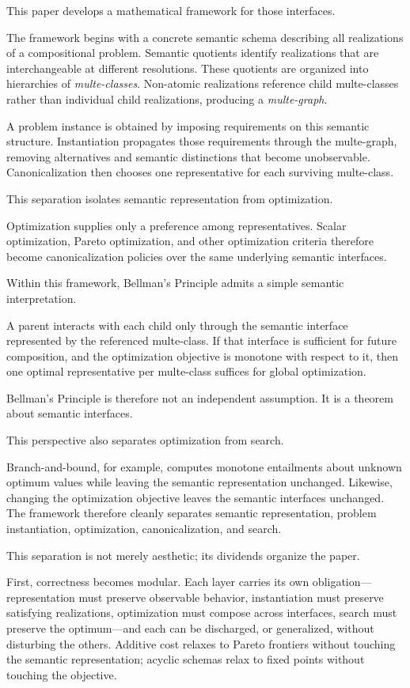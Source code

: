 \documentclass[sigconf,nonacm]{acmart}
\theoremstyle{definition}
\theoremstyle{plain}
\theoremstyle{remark}
\begin{document}
This paper develops a mathematical framework for those interfaces.

The framework begins with a concrete semantic schema describing all
realizations of a compositional problem.
Semantic quotients identify realizations that are interchangeable at
different resolutions.
These quotients are organized into hierarchies of
\emph{multe-classes}.
Non-atomic realizations reference child multe-classes rather than
individual child realizations, producing a \emph{multe-graph}.

A problem instance is obtained by imposing requirements on this
semantic structure.
Instantiation propagates those requirements through the multe-graph,
removing alternatives and semantic distinctions that become
unobservable.
Canonicalization then chooses one representative for each surviving
multe-class.

This separation isolates semantic representation from optimization.

Optimization supplies only a preference among representatives.
Scalar optimization, Pareto optimization, and other optimization
criteria therefore become canonicalization policies over the same
underlying semantic interfaces.

Within this framework, Bellman's Principle admits a simple semantic
interpretation.

A parent interacts with each child only through the semantic interface
represented by the referenced multe-class.
If that interface is sufficient for future composition, and the
optimization objective is monotone with respect to it, then one optimal
representative per multe-class suffices for global optimization.

Bellman's Principle is therefore not an independent assumption.
It is a theorem about semantic interfaces.

This perspective also separates optimization from search.

Branch-and-bound, for example, computes monotone entailments about
unknown optimum values while leaving the semantic representation
unchanged.
Likewise, changing the optimization objective leaves the semantic
interfaces unchanged.
The framework therefore cleanly separates semantic representation,
problem instantiation, optimization, canonicalization, and search.

This separation is not merely aesthetic; its dividends organize the
paper.

First, correctness becomes modular.  Each layer carries its own
obligation---representation must preserve observable behavior,
instantiation must preserve satisfying realizations, optimization
must compose across interfaces, search must preserve the
optimum---and each can be discharged, or generalized, without
disturbing the others.  Additive cost relaxes to Pareto frontiers
without touching the semantic representation; acyclic schemas relax
to fixed points without touching the objective.
\end{document}
